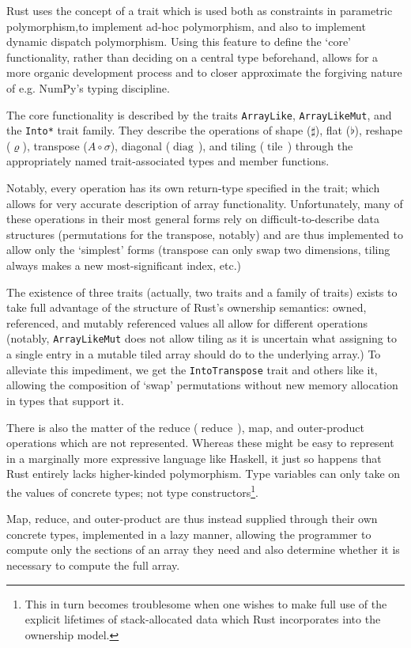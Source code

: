\documentclass{DIKU-report-variant}
\newcommand\mrm[1]{\mathrm{#1}}
\newcommand\brm[1]{\bm{\mrm{#1}}}
\newcommand\reduce{\operatorname*{\brm{reduce}\,}}
\newcommand\diag{\operatorname*{\brm{diag}\,}}
\newcommand\tile{\operatorname*{\brm{tile}\,}}
\begin{document}
Rust uses the concept of a trait which is used both as constraints in parametric polymorphism,to
implement ad-hoc polymorphism, and also to implement dynamic dispatch polymorphism. Using this feature
to define the `core' functionality, rather than deciding on a central type beforehand, allows for
a more organic development process and to closer approximate the forgiving nature of e.g. NumPy's
typing discipline.

The core functionality is described by the traits \texttt{ArrayLike}, \texttt{ArrayLikeMut}, and
the \texttt{Into*} trait family. They describe the operations of shape (\(\sharp\)), flat (\(\flat\)),
reshape (\(\varrho\)), transpose (\(A \circ \sigma\)), diagonal (\(\diag\)), and tiling (\(\tile\))
through the appropriately named trait-associated types and member functions.

Notably, every operation has its own return-type specified in the trait; which allows for very accurate
description of array functionality. Unfortunately, many of these operations in their most general forms
rely on difficult-to-describe data structures (permutations for the transpose, notably) and are thus
implemented to allow only the `simplest' forms (transpose can only swap two dimensions, tiling always
makes a new most-significant index, etc.)

The existence of three traits (actually, two traits and a family of traits) exists to take full advantage
of the structure of Rust's ownership semantics: owned, referenced, and mutably referenced values all
allow for different operations (notably, \texttt{ArrayLikeMut} does not allow tiling as it is uncertain what
assigning to a single entry in a mutable tiled array should do to the underlying array.) To alleviate
this impediment, we get the \texttt{IntoTranspose} trait and others like it, allowing the composition
of `swap' permutations without new memory allocation in types that support it.

There is also the matter of the reduce (\(\reduce\)), map, and outer-product operations which are not
represented. Whereas these might be easy to represent in a marginally more expressive language like
Haskell, it just so happens that Rust entirely lacks higher-kinded polymorphism. Type variables can
only take on the values of concrete types; not type constructors\footnote{This in turn becomes troublesome
when one wishes to make full use of the explicit lifetimes of stack-allocated data which Rust incorporates
into the ownership model.}.

Map, reduce, and outer-product are thus instead supplied through their own concrete types, implemented
in a lazy manner, allowing the programmer to compute only the sections of an array they need and also
determine whether it is necessary to compute the full array.
\end{document}
